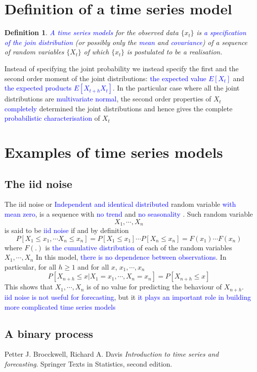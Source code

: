 \documentclass[11pt, oneside]{article}   	%
\newtheorem{definition}{Definition}
\begin{document}
\section{Definition of a time series model}
\begin{definition}
\textcolor{blue}{A time series models} for the observed data $\{ x_{t}\}$ is \textcolor{blue}{a specification of the join distribution} (or possibly only the \textcolor{blue}{mean} and \textcolor{blue}{covariance}) of a sequence of random variables $\{ X_{t}\}$ of which $\{ x_{t}\}$ is postulated to be a realisation.
\end{definition}
\justify
Instead of specifying the joint probability we instead specify the first and the second order moment of the joint distributions: \textcolor{blue}{the expected value $E[X_{t}]$} and
 \textcolor{blue}{the expected products $E[X_{t+h}X_{t}]$}.
 \justify
 In the particular case where all the joint distributions are \textcolor{blue}{multivariate normal}, the second order properties of $X_{t}$ \textcolor{blue}{completely} determined the joint distributions and hence gives the complete \textcolor{blue}{probabilistic characterisation} of $X_{t}$ 

\section{Examples of time series models}
\subsection{The iid noise}
The iid noise or \textcolor{blue}{Independent and identical distributed} random variable \textcolor{blue}{with mean zero}, is a sequence with \textcolor{blue}{no trend} and 
\textcolor{blue}{no seasonality }. Such random variable
\begin{equation}
X_{1}, \cdots, X_{n} \nonumber
\end{equation}
is said to be \textcolor{blue}{iid noise} if and by definition
\begin{equation}
P[X_{1} \leq x_{1},\cdots X_{n}\leq x_{n}] = P[X_{1}\leq x_{1}]\cdots P[X_{n} \leq x_{n}] = F(x_{1})\cdots F(x_{n})
\end{equation}
where $F(.)$ is \textcolor{blue}{the cumulative distribution} of each of the random variables $X_{1}, \cdots, X_{n}$ 
\justify
In this model, \textcolor{blue}{there is no dependence between observations}. In particular, for all $h\geq 1$ and for all $x$, $x_{1},\cdots,x_{n}$
\begin{equation}
P[X_{n+h}\leq x | X_{1}=x_{1}, \cdots, X_{n}=x_{n}] = P[X_{n+h}\leq x]
\end{equation}
This shows that $X_{1}, \cdots, X_{n}$ is of no value for predicting the behaviour of $X_{n+h}$. \textcolor{blue}{iid noise is not useful for forecasting}, but it \textcolor{blue}{it plays an important role in building more complicated time series models}
\subsection{A binary process}





\begin{thebibliography}{9}
Petter J. Brocckwell, Richard A. Davis 
\textit{Introduction to time series and forecasting}. 
Springer Texts in Statistics, second edition.
 
\end{thebibliography}
\end{document}
